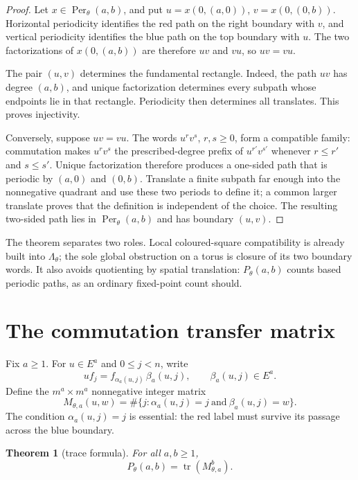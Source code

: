 \documentclass[11pt,a4paper]{amsart}
\newtheorem{theorem}{Theorem}[section]
\theoremstyle{definition}
\theoremstyle{remark}
\newcommand{\Per}{\operatorname{Per}}
\newcommand{\tr}{\operatorname{tr}}
\begin{document}
\begin{proof}
Let $x\in\Per_\theta(a,b)$, and put
$u=x(0,(a,0))$, $v=x(0,(0,b))$.  Horizontal periodicity identifies the red
path on the right boundary with $v$, and vertical periodicity identifies the
blue path on the top boundary with $u$.  The two factorizations of
$x(0,(a,b))$ are therefore $uv$ and $vu$, so $uv=vu$.

The pair $(u,v)$ determines the fundamental rectangle.  Indeed, the path
$uv$ has degree $(a,b)$, and unique factorization determines every subpath
whose endpoints lie in that rectangle.  Periodicity then determines all
translates.  This proves injectivity.

Conversely, suppose $uv=vu$.  The words $u^rv^s$, $r,s\geq0$, form a
compatible family: commutation makes $u^rv^s$ the prescribed-degree prefix
of $u^{r'}v^{s'}$ whenever $r\leq r'$ and $s\leq s'$.  Unique factorization
therefore produces a one-sided path that is periodic by $(a,0)$ and $(0,b)$.
Translate a finite subpath far enough into the nonnegative quadrant and use
these two periods to define it; a common larger translate proves that the
definition is independent of the choice.  The resulting two-sided path lies
in $\Per_\theta(a,b)$ and has boundary $(u,v)$.
\end{proof}

The theorem separates two roles.  Local coloured-square compatibility is
already built into $\Lambda_\theta$; the sole global obstruction on a torus
is closure of its two boundary words.  It also avoids quotienting by spatial
translation: $P_\theta(a,b)$ counts based periodic paths, as an ordinary
fixed-point count should.

\section{The commutation transfer matrix}

Fix $a\geq1$.  For $u\in E^a$ and $0\leq j<n$, write
\[
 u f_j=f_{\alpha_a(u,j)}\,\beta_a(u,j),
 \qquad \beta_a(u,j)\in E^a.
\]
Define the $m^a\times m^a$ nonnegative integer matrix
\begin{equation}\label{eq:transfer}
 M_{\theta,a}(u,w)=
 \#\{j: \alpha_a(u,j)=j\ \text{and}\ \beta_a(u,j)=w\}.
\end{equation}
The condition $\alpha_a(u,j)=j$ is essential: the red label must survive its
passage across the blue boundary.

\begin{theorem}[trace formula]\label{thm:trace}
For all $a,b\geq1$,
\[
 P_\theta(a,b)=\tr(M_{\theta,a}^{b}).
\]
\end{theorem}
\end{document}
